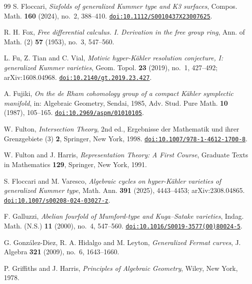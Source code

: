 \begin{thebibliography}{99}
S. Floccari,
\emph{Sixfolds of generalized Kummer type and K3 surfaces},
Compos. Math. \textbf{160} (2024), no.~2, 388--410.
\href{https://doi.org/10.1112/S0010437X23007625}{\texttt{doi:10.1112/S0010437X23007625}}.

R. H. Fox,
\emph{Free differential calculus. I. Derivation in the free group ring},
Ann. of Math. (2) \textbf{57} (1953), no.~3, 547--560.

L. Fu, Z. Tian and C. Vial,
\emph{Motivic hyper-K\"ahler resolution conjecture, I: generalized Kummer
varieties},
Geom. Topol. \textbf{23} (2019), no.~1, 427--492; arXiv:1608.04968.
\href{https://doi.org/10.2140/gt.2019.23.427}{\texttt{doi:10.2140/gt.2019.23.427}}.

A. Fujiki,
\emph{On the de Rham cohomology group of a compact K\"ahler symplectic
manifold},
in: Algebraic Geometry, Sendai, 1985, Adv. Stud. Pure Math. \textbf{10}
(1987), 105--165.
\href{https://doi.org/10.2969/aspm/01010105}{\texttt{doi:10.2969/aspm/01010105}}.

W. Fulton,
\emph{Intersection Theory}, 2nd ed.,
Ergebnisse der Mathematik und ihrer Grenzgebiete (3) \textbf{2},
Springer, New York, 1998.
\href{https://doi.org/10.1007/978-1-4612-1700-8}{\texttt{doi:10.1007/978-1-4612-1700-8}}.

W. Fulton and J. Harris,
\emph{Representation Theory: A First Course},
Graduate Texts in Mathematics \textbf{129}, Springer, New York, 1991.

S. Floccari and M. Varesco,
\emph{Algebraic cycles on hyper-K\"ahler varieties of generalized Kummer
type},
Math. Ann. \textbf{391} (2025), 4443--4453; arXiv:2308.04865.
\href{https://doi.org/10.1007/s00208-024-03027-z}{\texttt{doi:10.1007/s00208-024-03027-z}}.

F. Galluzzi,
\emph{Abelian fourfold of Mumford-type and Kuga--Satake varieties},
Indag. Math. (N.S.) \textbf{11} (2000), no.~4, 547--560.
\href{https://doi.org/10.1016/S0019-3577(00)80024-5}{\texttt{doi:10.1016/S0019-3577(00)80024-5}}.

G. Gonz\'alez-Diez, R. A. Hidalgo and M. Leyton,
\emph{Generalized Fermat curves},
J. Algebra \textbf{321} (2009), no.~6, 1643--1660.

P. Griffiths and J. Harris,
\emph{Principles of Algebraic Geometry},
Wiley, New York, 1978.


\end{thebibliography}
